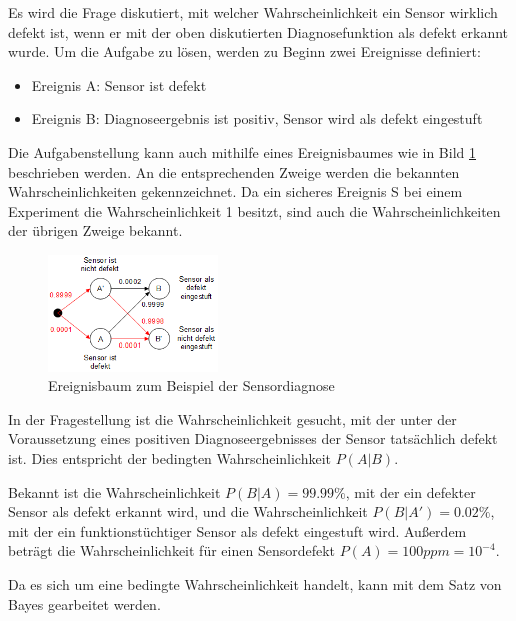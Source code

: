\noindent Es wird die Frage diskutiert, mit welcher Wahrscheinlichkeit ein Sensor wirklich defekt ist, wenn er mit der oben diskutierten Diagnosefunktion als defekt erkannt wurde. Um die Aufgabe zu l\"{o}sen, werden zu Beginn zwei Ereignisse definiert:

\begin{itemize}
    \item Ereignis A: Sensor ist defekt
    \item Ereignis B: Diagnoseergebnis ist positiv, Sensor wird als defekt eingestuft
\end{itemize}

\noindent Die Aufgabenstellung kann auch mithilfe eines Ereignisbaumes wie in Bild \ref{fig:Sensordiagnose} beschrieben werden. An die entsprechenden Zweige werden die bekannten Wahrscheinlichkeiten gekennzeichnet. Da ein sicheres Ereignis S bei einem Experiment die Wahrscheinlichkeit 1 besitzt, sind auch die Wahrscheinlichkeiten der \"{u}brigen Zweige bekannt. 

\noindent 
\begin{figure}[H]
  \centerline{\includegraphics[width=0.4\textwidth]{Kapitel2/Bilder/image14}}
  \caption{Ereignisbaum zum Beispiel der Sensordiagnose}
  \label{fig:Sensordiagnose}
\end{figure}

\noindent In der Fragestellung ist die Wahrscheinlichkeit gesucht, mit der unter der Voraussetzung eines positiven Diagnoseergebnisses der Sensor tats\"{a}chlich defekt ist. Dies entspricht der bedingten Wahrscheinlichkeit $P(A|B)$. \newline

\noindent Bekannt ist die Wahrscheinlichkeit $P(B|A) = 99.99\%$, mit der ein defekter Sensor als defekt erkannt wird, und die Wahrscheinlichkeit $P(B|A') = 0.02\%$, mit der ein funktionst\"{u}chtiger Sensor als defekt eingestuft wird. Au{\ss}erdem betr\"{a}gt die Wahrscheinlichkeit f\"{u}r einen Sensordefekt $P(A) = 100ppm = 10^{-4}$.\newline

\noindent Da es sich um eine bedingte Wahrscheinlichkeit handelt, kann mit dem Satz von Bayes gearbeitet werden.

